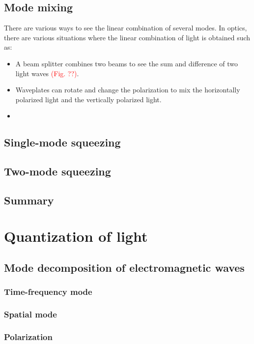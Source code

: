 \documentclass{book}
\begin{document}
\section{Mode mixing}
There are various ways to see the linear combination of several modes. In optics, there are various situations where the linear combination of light is obtained such as: 
\begin{itemize}
	\item A beam splitter combines two beams to see the sum and difference of two light waves \textcolor{red}{(Fig. ??)}.
	\item Waveplates can rotate and change the polarization to mix the horizontally polarized light and the vertically polarized light.
	\item  
\end{itemize}



\section{Single-mode squeezing}

\section{Two-mode squeezing}

\section{Summary}




\chapter{Quantization of light}
\section{Mode decomposition of electromagnetic waves}
\subsection{Time-frequency mode}
\subsection{Spatial mode}
\subsection{Polarization}
\end{document}
